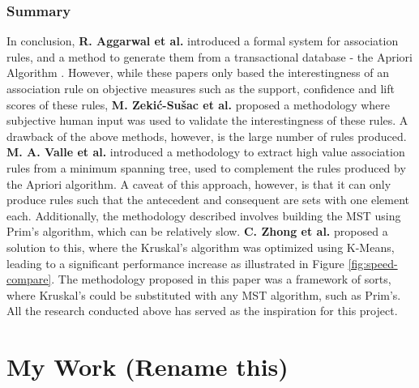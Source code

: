 \documentclass[paper=a4,fontsize=11pt]{report}	%
\begin{document}
\subsection{Summary}
In conclusion, \textbf{R. Aggarwal et al.} introduced a formal system for association rules, and a method to generate them from a transactional database - the Apriori Algorithm \cite{apriori}.  However, while these papers only based the interestingness of an association rule on objective measures such as the support, confidence and lift scores of these rules, \textbf{M. Zekić-Sušac et al.} proposed a methodology where subjective human input was used to validate the interestingness of these rules. A drawback of the above methods, however, is the large number of rules produced. \textbf{M. A. Valle et al.} introduced a methodology to extract high value association rules from a minimum spanning tree, used to complement the rules produced by the Apriori algorithm. A caveat of this approach, however, is that it can only produce rules such that the antecedent and consequent are sets with one element each. Additionally, the methodology described involves building the MST using Prim's algorithm, which can be relatively slow. \textbf{C. Zhong et al.} proposed a solution to this, where the Kruskal's algorithm was optimized using K-Means, leading to a significant performance increase as illustrated in Figure \ref{fig:speed-compare}. The methodology proposed in this paper was a framework of sorts, where Kruskal's could be substituted with any MST algorithm, such as Prim's.
All the research conducted above has served as the inspiration for this project.


\chapter{My Work (Rename this)}
\end{document}
